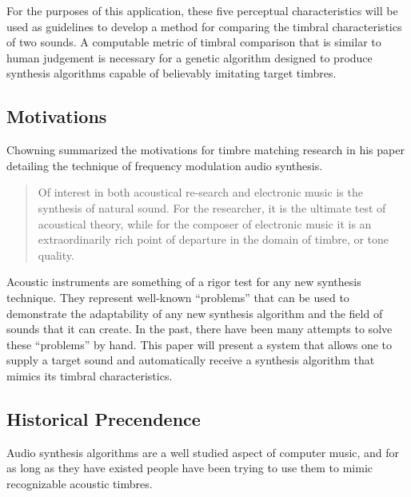 \documentclass[12pt]{article}
\begin{document}
For the purposes of this application, these five perceptual characteristics will be used as guidelines to develop a method for comparing the timbral characteristics of two sounds. A computable metric of timbral comparison that is similar to human judgement is necessary for a genetic algorithm designed to produce synthesis algorithms capable of believably imitating target timbres.



\subsection{Motivations}\label{TMMOTIVATION}
Chowning summarized the motivations for timbre matching research in his paper detailing the technique of frequency modulation audio synthesis.
\begin{quote}
Of interest in both acoustical re-search and electronic music is the synthesis of natural sound. For the researcher, it is the ultimate test of acoustical theory, while for the composer of electronic music it is an extraordinarily rich point of departure in the domain of timbre, or tone quality. \citep{chowning1973synthesis}
\end{quote}
Acoustic instruments are something of a rigor test for any new synthesis technique. They represent well-known ``problems'' that can be used to demonstrate the adaptability of any new synthesis algorithm and the field of sounds that it can create. In the past, there have been many attempts to solve these ``problems'' by hand. This paper will present a system that allows one to supply a target sound and automatically receive a synthesis algorithm that mimics its timbral characteristics.
	

\subsection{Historical Precendence}\label{TMHISTORY}
Audio synthesis algorithms are a well studied aspect of computer music, and for as long as they have existed people have been trying to use them to mimic recognizable acoustic timbres.
\end{document}
